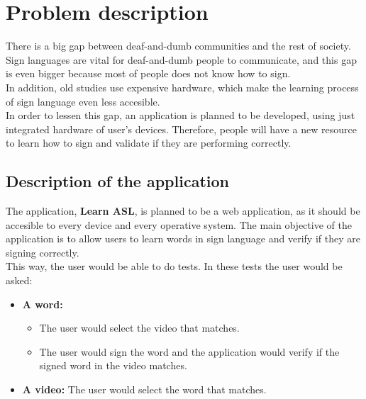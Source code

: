 \chapter{Problem description}

There is a big gap between deaf-and-dumb communities and the rest of society. Sign languages are vital for deaf-and-dumb people to communicate, and this gap is even bigger because most of people does not know how to sign. \\

In addition, old studies use expensive hardware, which make the learning process of sign language even less accesible. \\ 

In order to lessen this gap, an application is planned to be developed, using just integrated hardware of user's devices. Therefore, people will have a new resource to learn how to sign and validate if they are performing correctly.

\section{Description of the application}
The application, \textbf{Learn ASL}, is planned to be a web application, as it should be accesible to every device and every operative system.
The main objective of the application is to allow users to learn words in sign language and verify if they are signing correctly. \\

This way, the user would be able to do tests. In these tests the user would be asked:
\begin{itemize}[noitemsep]
    \item \textbf{A word:} 
        \begin{itemize}[noitemsep]
            \item The user would select the video that matches.
            \item The user would sign the word and the application would verify if the signed word in the video matches.
        \end{itemize}
    \item \textbf{A video:} The user would select the word that matches.
\end{itemize}

